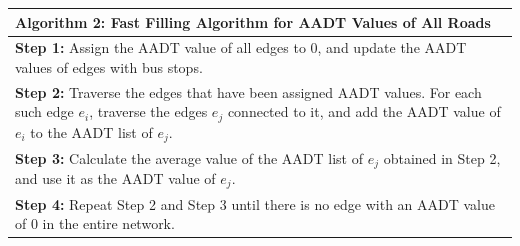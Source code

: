 \documentclass{mcmthesis}
\begin{document}
\begin{table}[H]
  \centering
  \label{tab:AADTFilling}
  \begin{tabular}{@{}p{}@{}}
  \toprule
  \textbf{Algorithm 2: Fast Filling Algorithm for AADT Values of All Roads} \\ 
  \midrule
  \textbf{Step 1:} Assign the AADT value of all edges to 0, and update the AADT values of edges with bus stops. \\
  \textbf{Step 2:} Traverse the edges that have been assigned AADT values. For each such edge \(e_i\), traverse the edges \(e_j\) connected to it, and add the AADT value of \(e_i\) to the AADT list of \(e_j\). \\
  \textbf{Step 3:} Calculate the average value of the AADT list of \(e_j\) obtained in Step 2, and use it as the AADT value of \(e_j\). \\
  \textbf{Step 4:} Repeat Step 2 and Step 3 until there is no edge with an AADT value of 0 in the entire network. \\ \bottomrule
  \end{tabular}
\end{table}
\end{document}
